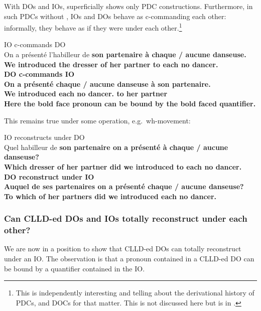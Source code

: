 \documentclass[output=paper]{langsci/langscibook}
\begin{document}
With \glspl{DO} and \glspl{IO},  superficially shows only
\gls{PDC} constructions.  Furthermore, in
such \glspl{PDC} without  , IOs and DOs behave as c-commanding
each other: informally, they behave as if they were under each
other.\footnote{This is independently interesting and telling about the
    derivational history of \glspl{PDC}, and \glspl{DOC} for that matter. This is  not discussed here but is in
\textcite{Sportiche2017}.}

\ea \label{doio1}
\ea IO c-commands DO\\
\gll On {a pr\'{e}sent\'{e}} l'habilleur de \bf{son} partenaire \`{a}
\textbf{chaque} / \textbf{aucune} danseuse.\\
We introduced {the dresser} of her partner to each {} no dancer.\glossF{} \\
\ex  DO c-commands IO\\
\gll On {a pr\'{e}sent\'{e}} \textbf{chaque} / \textbf{aucune} danseuse \`{a}
\bf{son} partenaire.\\
We introduced each {} no dancer.\glossF{} to her partner\\
\z
\z
%
Here the bold face pronoun can be bound by the bold faced quantifier.

This remains true under some  operation, e.g.\ wh-movement:

\ea \label{doio2}
\ea IO reconstructs under DO\\
\gll Quel habilleur de \bf{son} partenaire on {a pr\'{e}sent\'{e}} \`{a} \textbf{chaque} / \textbf{aucune} danseuse?\\
Which dresser of her {partner did} we introduced to each {} no dancer.\glossF{} \\
\ex DO reconstruct under IO\\
\gll  Auquel de  \bf{ses} partenaires on {a pr\'{e}sent\'{e}} \textbf{chaque} / \textbf{aucune} danseuse?\\
{To which} of her {partners did} we introduced each {} no dancer.\glossF{} \\
\z
\z

\subsubsection{Can CLLD-ed DOs and IOs totally reconstruct
under each other?}\label{frozenscope}

We are now in a position to show that \gls{CLLD}-ed \glspl{DO} can totally
reconstruct under an  IO. The observation is that a pronoun contained in a
\gls{CLLD}-ed \gls{DO} can be bound by a quantifier contained in the \gls{IO}.
\end{document}
